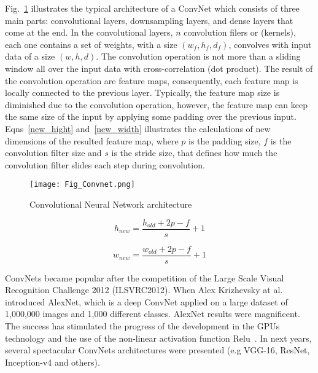 Fig.~\ref{fig:Convnet} illustrates  the typical architecture of a ConvNet which consists of three main parts: convolutional layers, downsampling layers, and dense layers that come at the end.
In the convolutional layers, \( n\) convolution filers or (kernels), each one contains a set of weights, with a size \((w_f,h_f,d_f)\), convolves with input data of a size \((w,h,d)\).
The convolution operation is not more than a sliding window all over the input data with cross-correlation (dot product).
The result of the convolution operation are feature maps, consequently, each feature map is locally connected to the previous layer. 
Typically, the feature map size is diminished due to the convolution operation, however, the feature map can keep the same size of the input by applying some padding over the previous input. Eqns~\ref{new_hight} and~\ref{new_width} illustrates the calculations of new dimensions of the resulted feature map, where \(p\) is the padding size, \(f\) is the convolution filter size and \(s\) is the stride size, that defines how much the convolution filter slides each step during convolution.

\begin{figure} [h!]
	\begin{center}
		\centering
	\texttt{[image: Fig\_Convnet.png]}
	\end{center}
	
\caption{Convolutional Neural Network architecture}
 
	\label{fig:Convnet}
\end{figure}

\begin{equation}
h_{new} = \frac{h_{old}+2p-f}{s}+1  
\label{new_hight}\end{equation}

\begin{equation}
w_{new} = \frac{w_{old}+2p-f}{s}+1
\label{new_width}\end{equation}

ConvNets became popular after the competition of the Large Scale Visual Recognition Challenge 2012 (ILSVRC2012). 
When Alex Krizhevsky at al. introduced AlexNet, which is a deep ConvNet applied on a large dataset of 1,000,000 images and 1,000 different classes.
AlexNet results were magnificent. 
The success has stimulated the progress of the development in the GPUs technology and the use of the non-linear activation function Relu~\cite{Lecun2015}.
In next years, several spectacular ConvNets architectures were presented (e.g VGG-16, ResNet, Inception-v4 and others).


